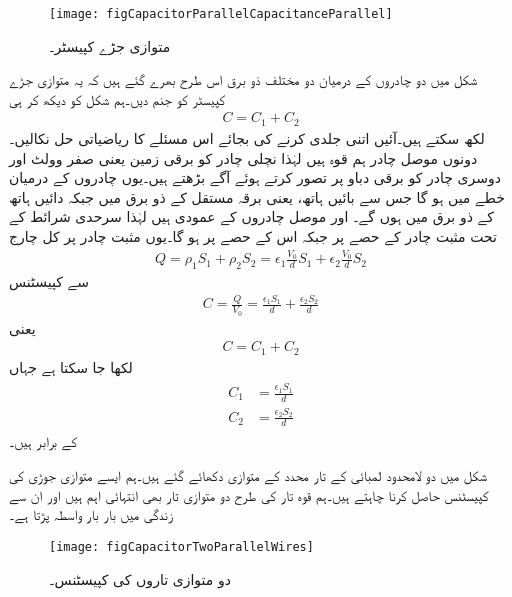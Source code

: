\begin{figure}[!ht]
\centering
\texttt{[image: figCapacitorParallelCapacitanceParallel]}
\caption{متوازی جڑے کپیسٹر۔}
\label{شکل_کپیسٹر_متوازی_جڑے}
\end{figure} 

شکل  میں دو چادروں کے درمیان دو مختلف ذو برق اس طرح بھرے گئے ہیں کہ یہ متوازی جڑے کپیسٹر کو جنم دیں۔ہم شکل کو دیکھ کر ہی 
\begin{align}
C=C_1+C_2
\end{align}
لکھ سکتے ہیں۔آئیں اتنی جلدی کرنے کی بجائے اس مسئلے کا ریاضیاتی حل نکالیں۔دونوں موصل چادر ہم قوہ ہیں لہٰذا نچلی چادر کو برقی زمین یعنی صفر وولٹ اور دوسری چادر کو  برقی دباو پر تصور کرتے ہوئے آگے بڑھتے ہیں۔یوں چادروں کے درمیان خطے میں  ہو گا جس سے بائیں ہاتھ، یعنی  برقہ مستقل کے ذو برق میں  جبکہ دائیں ہاتھ کے ذو برق میں  ہوں گے۔ اور  موصل چادروں کے عمودی ہیں لہٰذا سرحدی شرائط کے تحت مثبت چادر کے  حصے پر  جبکہ اس کے  حصے پر  ہو گا۔یوں مثبت چادر پر کل چارج
\begin{align*}
Q=\rho_1 S_1+\rho_2 S_2=\epsilon_1 \frac{V_0}{d} S_1+\epsilon_2 \frac{V_0}{d}S_2
\end{align*}
سے کپیسٹنس
\begin{align*}
C=\frac{Q}{V_0}=\frac{\epsilon_1 S_1}{d}+\frac{\epsilon_2 S_2}{d}
\end{align*}
یعنی
\begin{align}
C=C_1+C_2
\end{align}
لکھا جا سکتا ہے جہاں
\begin{gather}
\begin{aligned}
C_1&=\frac{\epsilon_1 S_1}{d}\\
C_2&=\frac{\epsilon_2 S_2}{d}
\end{aligned}
\end{gather}
کے برابر ہیں۔

شکل  میں دو لامحدود لمبائی کے تار  محدد کے متوازی دکھائے گئے ہیں۔ہم ایسے متوازی جوڑی کی کپیسٹنس حاصل کرنا چاہتے ہیں۔ہم قوہ تار کی طرح دو متوازی تار بھی انتہائی اہم ہیں اور ان سے زندگی میں بار بار واسطہ پڑتا ہے۔
\begin{figure}
\centering
\texttt{[image: figCapacitorTwoParallelWires]}
\caption{دو متوازی تاروں کی کپیسٹنس۔}
\label{شکل_کپیسٹر_متوازی_تار}
\end{figure}

